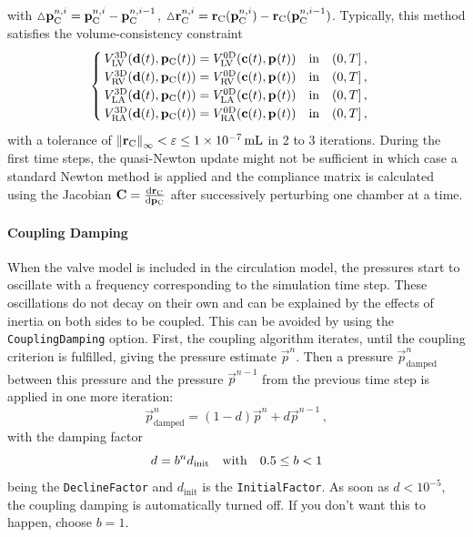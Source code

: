 with ${\vartriangle} \vp{C}^{n,i} = \vp{C}^{n,i}-\vp{C}^{n,i-1}$, ${\vartriangle} \res{C}^{n,i} = \res{C} (\vp{C}^{n,i})-\res{C} (\vp{C}^{n,i-1})$.
Typically, this method satisfies the volume-consistency constraint 
\begin{align}
\begin{cases}
\vol{LV}^\mathrm{3D}(\d(t),\vp{C}(t)) = \vol{LV}^\mathrm{0D}(\c(t),\vp{}(t)) \qin (0,T] \,, & \\
\vol{RV}^\mathrm{3D}(\d(t),\vp{C}(t)) = \vol{RV}^\mathrm{0D}(\c(t),\vp{}(t)) \qin (0,T] \,, & \\
\vol{LA}^\mathrm{3D}(\d(t),\vp{C}(t)) = \vol{LA}^\mathrm{0D}(\c(t),\vp{}(t)) \qin (0,T] \,, & \\
\vol{RA}^\mathrm{3D}(\d(t),\vp{C}(t)) = \vol{RA}^\mathrm{0D}(\c(t),\vp{}(t)) \qin (0,T] \,, & \\
\end{cases} \label{eq:volumeConstraint}
\end{align}
with a tolerance of $\norm{\res{C}}_\infty < \varepsilon \leq \SI{1e-7}{\milli\litre}$ in 2 to 3 iterations.
During the first time steps, the quasi-Newton update might not be sufficient in which case a standard Newton method is applied and the compliance matrix is calculated using the Jacobian $\vec C = \dv{\res{C}}{\vp{C}}$ after successively perturbing one chamber at a time.

\paragraph{Coupling Damping} When the valve model is included in the circulation model, the pressures start to oscillate with a frequency corresponding to the simulation time step.
These oscillations do not decay on their own and can be explained by the effects of inertia on both sides to be coupled.
This can be avoided by using the \verb|CouplingDamping| option.
First, the coupling algorithm iterates, until the coupling criterion is fulfilled, giving the pressure estimate $\vec p^n$.
Then a pressure $\vec p^n_\mathrm{damped}$ between this pressure and the pressure $\vec p^{n-1}$ from the previous time step is applied in one more iteration:
\begin{equation}
    \vec p^n_\mathrm{damped} = (1-d)\vec p^n + d \vec p^{n-1} \,,
\end{equation}
with the damping factor
\begin{equation}
    d = b^n d_\mathrm{init} \qq{with} 0.5 \leq b < 1
\end{equation}
being the \verb|DeclineFactor| and $d_\mathrm{init}$ is the \verb|InitialFactor|.
As soon as $d < 10^{-5}$, the coupling damping is automatically turned off.
If you don't want this to happen, choose $b = 1$.

